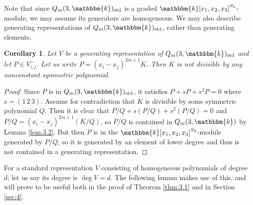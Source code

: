 \documentclass[11pt]{article}
\newtheorem{corollary}[theorem]{Corollary}
\theoremstyle{definition}
\renewcommand{\k}{\mathbbm{k}}
\newcommand{\std}{\mathrm{std}}
\begin{document}
Note that since $Q_m(3,\k)_\std$ is a graded $\k[x_1,x_2,x_3]^{S_3}$-module, we may assume its generators are homogeneous. We may also describe generating representations of $Q_m(3,\k)_\std$, rather than generating elements. 

\begin{corollary}\label{cor:3.3}
    Let $V$ be a generating representation of $Q_m(3,\k)_\std$ and let $P\in V_{i,j}^-$. Let us write $P=(x_i-x_j)^{2m+1}K$. Then $K$ is not divisible by any nonconstant symmetric polynomial.
\end{corollary}
\begin{proof}
    Since $P$ is in $Q_m(3,\k)_\std$, it satisfies $P+sP+s^2P=0$ where $s=(1\,2\,3)$. Assume for contradiction that $K$ is divisible by some symmetric polynomial $Q$. Then it is clear that \linebreak
    $P/Q+s(P/Q)+s^2(P/Q)=0$ and $P/Q=(x_i-x_j)^{2m+1}(K/Q)$, so $P/Q$ is contained in $Q_m(3,\k)$ by Lemma \ref{lem:3.2}. But then $P$ is in the $\k[x_1,x_2,x_3]^{S_3}$-module generated by $P/Q$, so it is generated by an element of lower degree and thus is not contained in a generating representation.
\end{proof}

For a standard representation $V$ consisting of homogeneous polynomials of degree $d$, let us say its degree is $\deg V=d$. The following lemma makes use of this, and will prove to be useful both in the proof of Theorem \ref{thm:3.1} and in Section \ref{sec:4}.
\end{document}
